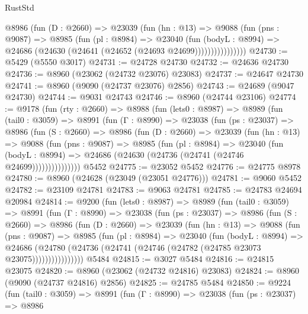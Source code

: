 \begin{lexlean}{RustStd}
\begin{coremodule}
                @8986
                  (fun (D : @2660) =>
                  @23039
                    (fun (hn : @13) =>
                    @9088
                      (fun (pns : @9087) =>
                      @8985
                        (fun (pl : @8984) =>
                        @23040
                          (fun (bodyL : @8994) =>
                          @24686 (@24630 (@24641 (@24652 (@24693 @24699))))))))))))))))
@24730 := @5429 (@5550 @3017)
@24731 := @24728 @24730
@24732 := @24636 @24730
@24736 := @8960 (@23062 (@24732 @23076) @23083)
@24737 := @24647 @24730
@24741 := @8960 (@9090 (@24737 @23076) @2856)
@24743 := @24689 (@9047 @24730)
@24744 := @9031 @24743
@24746 := @8960 (@24744 @23106)
@24774 := @9178
    (fun (rty : @2660) =>
    @8988
      (fun (lets0 : @8987) =>
      @8989
        (fun (tail0 : @3059) =>
        @8991
          (fun (Γ : @8990) =>
          @23038
            (fun (ps : @23037) =>
            @8986
              (fun (S : @2660) =>
              @8986
                (fun (D : @2660) =>
                @23039
                  (fun (hn : @13) =>
                  @9088
                    (fun (pns : @9087) =>
                    @8985
                      (fun (pl : @8984) =>
                      @23040
                        (fun (bodyL : @8994) =>
                        @24686 (@24630 (@24736 (@24741 (@24746 @24699)))))))))))))))
    @5452
@24775 := @23052 @5452
@24776 := @24775 @8978
@24780 := @8960 (@24628 (@23049 (@23051 @24776)))
@24781 := @9060 @5452
@24782 := @23109 @24781
@24783 := @9063 @24781
@24785 := @24783 @24694 @20984
@24814 := @9200
    (fun (lets0 : @8987) =>
    @8989
      (fun (tail0 : @3059) =>
      @8991
        (fun (Γ : @8990) =>
        @23038
          (fun (ps : @23037) =>
          @8986
            (fun (S : @2660) =>
            @8986
              (fun (D : @2660) =>
              @23039
                (fun (hn : @13) =>
                @9088
                  (fun (pns : @9087) =>
                  @8985
                    (fun (pl : @8984) =>
                    @23040
                      (fun (bodyL : @8994) =>
                      @24686
                        (@24780
                          (@24736 (@24741 (@24746 (@24782 (@24785 @23073 @23075))))))))))))))))
    @5484
@24815 := @3027 @5484
@24816 := @24815 @23075
@24820 := @8960 (@23062 (@24732 @24816) @23083)
@24824 := @8960 (@9090 (@24737 @24816) @2856)
@24825 := @24785 @5484
@24850 := @9224
    (fun (tail0 : @3059) =>
    @8991
      (fun (Γ : @8990) =>
      @23038
        (fun (ps : @23037) =>
        @8986

\end{coremodule}
\end{lexlean}
